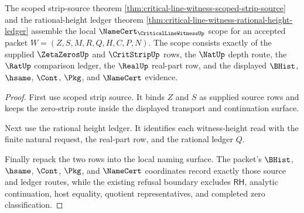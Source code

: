 \begin{theorem}
\label{thm:critical-line-witness-namecert-scope-package}
The scoped strip-source theorem
\autoref{thm:critical-line-witness-scoped-strip-source} and the rational-height
ledger theorem \autoref{thm:critical-line-witness-rational-height-ledger}
assemble the local $\NameCert_{\CriticalLineWitnessUp}$ scope for an accepted
packet $W=(Z,S,M,R,Q,H,C,P,N)$. The scope consists exactly of the supplied
$\ZetaZerosUp$ and $\CritStripUp$ rows, the $\NatUp$ depth route, the $\RatUp$
comparison ledger, the $\RealUp$ real-part row, and the displayed $\BHist$,
$\hsame$, $\Cont$, $\Pkg$, and $\NameCert$ evidence.
\end{theorem}
\begin{proof}
First use scoped strip source. It binds $Z$ and $S$ as supplied source rows and
keeps the zero-strip route inside the displayed transport and continuation
surface.

Next use the rational height ledger. It identifies each witness-height read with
the finite natural request, the real-part row, and the rational ledger $Q$.

Finally repack the two rows into the local naming surface. The packet's
$\BHist$, $\hsame$, $\Cont$, $\Pkg$, and $\NameCert$ coordinates record exactly
those source and ledger routes, while the existing refusal boundary excludes
$\mathsf{RH}$, analytic continuation, host equality, quotient representatives,
and completed zero classification.
\end{proof}
